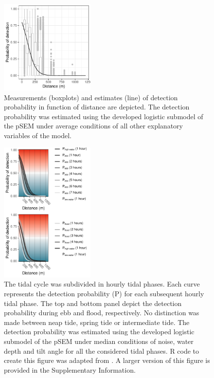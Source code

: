 \documentclass[doublespacing,linenumbers]{bmcart}
\begin{document}
\begin{backmatter}
\begin{figure}[h!]
  \includegraphics[width=0.42\textwidth]{logit_distance_plot.pdf}
  \caption{
      Measurements (boxplots) and estimates (line) of detection probability in function of distance are depicted. The detection probability was estimated using the developed logistic submodel of the pSEM under average conditions of all other explanatory variables of the model.}
  \label{fig:logit_distance_plot}
\end{figure}

\begin{figure}[h!]
  \includegraphics[width=0.42\textwidth]{DR_tide}
  \caption{
      The tidal cycle was subdivided in hourly tidal phases. Each curve represents the detection probability (P) for each subsequent hourly tidal phase. The top and bottom panel depict the detection probability during ebb and flood, respectively. No distinction was made between neap tide, spring tide or intermediate tide. The detection probability was estimated using the developed logistic submodel of the pSEM under median conditions of noise, water depth and tilt angle for all the considered tidal phases. R code to create this figure was adapted from \cite{Goossens2022TakingAssessments}. A larger version of this figure is provided in the Supplementary Information.}
  \label{fig:DR_tide}
\end{figure}


\end{backmatter}
\end{document}
